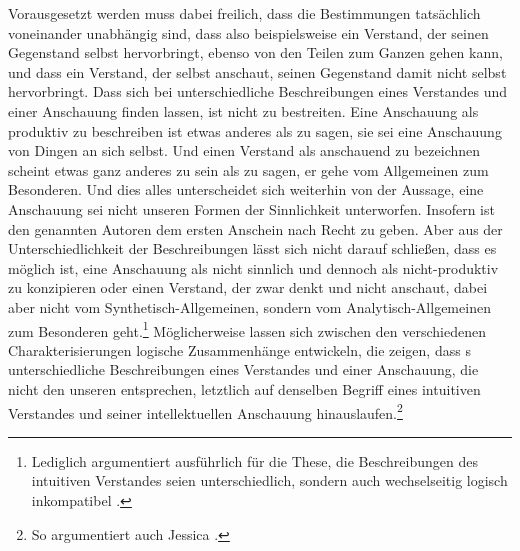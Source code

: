 Vorausgesetzt werden muss dabei freilich, dass die Bestimmungen tatsächlich
voneinander unabhängig sind, dass also beispielsweise ein Verstand, der seinen
Gegenstand selbst hervorbringt, ebenso von den Teilen zum Ganzen gehen kann, und
dass ein Verstand, der selbst anschaut, seinen Gegenstand damit nicht selbst
hervorbringt. Dass sich bei  unterschiedliche
Beschreibungen eines  Verstandes und einer  Anschauung
finden lassen, ist nicht zu bestreiten. Eine Anschauung als produktiv zu
beschreiben ist etwas anderes als zu sagen, sie sei eine Anschauung von Dingen
an sich selbst. Und einen Verstand als anschauend zu bezeichnen scheint etwas
ganz anderes zu sein als zu sagen, er gehe vom Allgemeinen zum Besonderen.
Und dies alles unterscheidet sich weiterhin von der Aussage, eine Anschauung sei
nicht unseren Formen der Sinnlichkeit unterworfen. Insofern ist den genannten
Autoren dem ersten Anschein nach Recht zu geben. Aber aus der
Unterschiedlichkeit der Beschreibungen lässt sich nicht darauf schließen, dass es möglich ist, eine
Anschauung als nicht sinnlich und dennoch als nicht-produktiv zu konzipieren
oder einen Verstand, der zwar denkt und nicht anschaut, dabei aber nicht vom
Synthetisch-Allgemeinen, sondern vom Analytisch-Allgemeinen zum Besonderen
geht.\footnote{Lediglich 
argumentiert ausführlich für die These, die Beschreibungen des intuitiven
Verstandes seien unterschiedlich, sondern auch wechselseitig logisch
inkompatibel \parencite[vgl.][287--296]{Gram:IntellectualIntuition1981}.}
Möglicherweise lassen sich zwischen den verschiedenen Charakterisierungen logische
Zusammenhänge entwickeln, die zeigen, dass s
unterschiedliche Beschreibungen eines Verstandes und einer Anschauung, die nicht
den unseren entsprechen, letztlich auf denselben Begriff eines intuitiven
Verstandes und seiner intellektuellen Anschauung hinauslaufen.\footnote{So
argumentiert auch Jessica
\textcite[vgl.][348--356]{Leech:MakingModalDistinctions2014}.}

